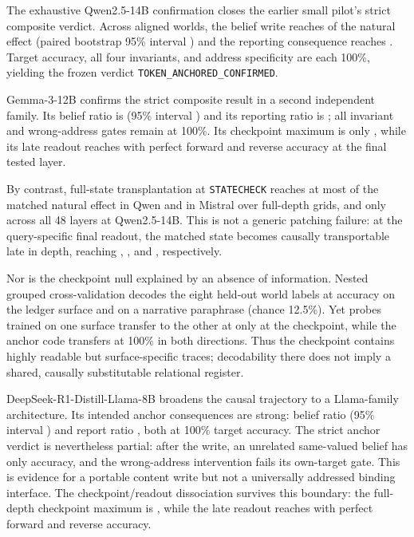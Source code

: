 \documentclass[10pt]{article}
\begin{document}
The exhaustive Qwen2.5-14B confirmation closes the earlier small pilot's strict
composite verdict. Across \ConfirmQwenFourteenAnchorN{} aligned worlds, the
belief write reaches \ConfirmQwenFourteenAnchorBelief{} of the natural effect
(paired bootstrap 95\% interval \ConfirmQwenFourteenAnchorBeliefCI{}) and the
reporting consequence reaches \ConfirmQwenFourteenAnchorTell{}. Target
accuracy, all four invariants, and address specificity are each 100\%, yielding
the frozen verdict \texttt{TOKEN\_ANCHORED\_CONFIRMED}.

Gemma-3-12B confirms the strict composite result in a second independent
family. Its belief ratio is \ConfirmGemmaAnchorBelief{} (95\% interval
\ConfirmGemmaAnchorBeliefCI{}) and its reporting ratio is
\ConfirmGemmaAnchorTell{}; all invariant and wrong-address gates remain at
100\%. Its checkpoint maximum is only \ConfirmGemmaCheckpointMax{}, while its
late readout reaches \ConfirmGemmaReadoutMax{} with perfect forward and reverse
accuracy at the final tested layer.

By contrast, full-state transplantation at \texttt{STATECHECK} reaches at most
\ConfirmQwenCheckpointMax{} of the matched natural effect in Qwen and
\ConfirmMistralCheckpointMax{} in Mistral over full-depth grids, and only
\ConfirmQwenFourteenCheckpointMax{} across all 48 layers at Qwen2.5-14B. This
is not a generic patching failure: at the query-specific final readout, the
matched state becomes causally transportable late in depth, reaching
\ConfirmQwenReadoutMax{}, \ConfirmMistralReadoutMax{}, and
\ConfirmQwenFourteenReadoutMax{}, respectively.

Nor is the checkpoint null explained by an absence of information. Nested
grouped cross-validation decodes the eight held-out world labels at
\ConfirmQwenFourteenProbeCheckpointLedger{} accuracy on the ledger surface and
\ConfirmQwenFourteenProbeCheckpointNarrative{} on a narrative paraphrase
(chance 12.5\%). Yet probes trained on one surface transfer to the other at
only \ConfirmQwenFourteenProbeCheckpointCross{} at the checkpoint, while the
anchor code transfers at 100\% in both directions. Thus the checkpoint contains
highly readable but surface-specific traces; decodability there does not imply
a shared, causally substitutable relational register.

DeepSeek-R1-Distill-Llama-8B broadens the causal trajectory to a Llama-family
architecture. Its intended anchor consequences are strong: belief ratio
\ConfirmDeepseekAnchorBelief{} (95\% interval
\ConfirmDeepseekAnchorBeliefCI{}) and report ratio
\ConfirmDeepseekAnchorTell{}, both at 100\% target accuracy. The strict anchor
verdict is nevertheless partial: after the write, an unrelated same-valued
belief has only \ConfirmDeepseekInvariantBeliefBC{} accuracy, and the
wrong-address intervention fails its own-target gate. This is evidence for a
portable content write but not a universally addressed binding interface. The
checkpoint/readout dissociation survives this boundary: the full-depth
checkpoint maximum is \ConfirmDeepseekCheckpointMax{}, while the late readout
reaches \ConfirmDeepseekReadoutMax{} with perfect forward and reverse accuracy.
\end{document}
